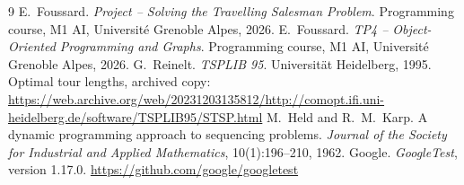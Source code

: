 \documentclass[10pt,a4paper]{article}
\begin{document}
\begin{thebibliography}{9}
 E.~Foussard. \emph{Project -- Solving the Travelling Salesman Problem}. Programming course, M1 AI, Universit\'e Grenoble Alpes, 2026.
 E.~Foussard. \emph{TP4 -- Object-Oriented Programming and Graphs}. Programming course, M1 AI, Universit\'e Grenoble Alpes, 2026.
 G.~Reinelt. \emph{TSPLIB 95}. Universit\"at Heidelberg, 1995. Optimal tour lengths, archived copy: \url{https://web.archive.org/web/20231203135812/http://comopt.ifi.uni-heidelberg.de/software/TSPLIB95/STSP.html}
 M.~Held and R.~M.~Karp. A dynamic programming approach to sequencing problems. \emph{Journal of the Society for Industrial and Applied Mathematics}, 10(1):196--210, 1962.
 Google. \emph{GoogleTest}, version 1.17.0. \url{https://github.com/google/googletest}
\end{thebibliography}
\end{document}

